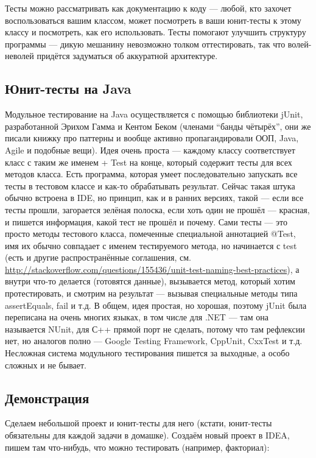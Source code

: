 \documentclass[a5paper]{article}
\begin{document}
Тесты можно рассматривать как документацию к коду --- любой, кто захочет воспользоваться вашим классом, может посмотреть в ваши юнит-тесты к этому классу и посмотреть, как его использовать.
Тесты помогают улучшить структуру программы --- дикую мешанину невозможно толком оттестировать, так что волей-неволей придётся задуматься об аккуратной архитектуре.

\subsection{Юнит-тесты на Java}

Модульное тестирование на Java осуществляется с помощью библиотеки jUnit, разработанной Эрихом Гамма и Кентом Беком (членами ``банды чётырёх'', они же писали книжку про паттерны и вообще активно пропагандировали ООП, Java, Agile и подобные вещи). Идея очень проста ---  каждому классу соответствует класс с таким же именем + Test на конце, который содержит тесты для всех методов класса. Есть программа, которая умеет последовательно запускать все тесты в тестовом классе и как-то обрабатывать результат. Сейчас такая штука обычно встроена в IDE, но принцип, как и в ранних версиях, такой --- если все тесты прошли, загорается зелёная полоска, если хоть один не прошёл --- красная, и пишется информация, какой тест не прошёл и почему. Сами тесты --- это просто методы тестового класса, помеченные специальной аннотацией @Test, имя их обычно совпадает с именем тестируемого метода, но начинается с test (есть и другие распространённые соглашения, см. \url{http://stackoverflow.com/questions/155436/unit-test-naming-best-practices}), а внутри что-то делается (готовятся данные), вызывается метод, который хотим протестировать, и смотрим на результат --- вызывая специальные методы типа assertEquals, fail и т.д. В общем, идея простая, но хорошая, поэтому jUnit была переписана на очень многих языках, в том числе для .NET --- там она называется NUnit, для С++ прямой порт не сделать, потому что там рефлексии нет, но аналогов полно --- Google Testing Framework, CppUnit, CxxTest и т.д. Несложная система модульного тестирования пишется за выходные, а особо сложных и не бывает.

\subsection{Демонстрация}

Сделаем небольшой проект и юнит-тесты для него (кстати, юнит-тесты обязательны для каждой задачи в домашке). Создаём новый проект в IDEA, пишем там что-нибудь, что можно тестировать (например, факториал):
\end{document}
